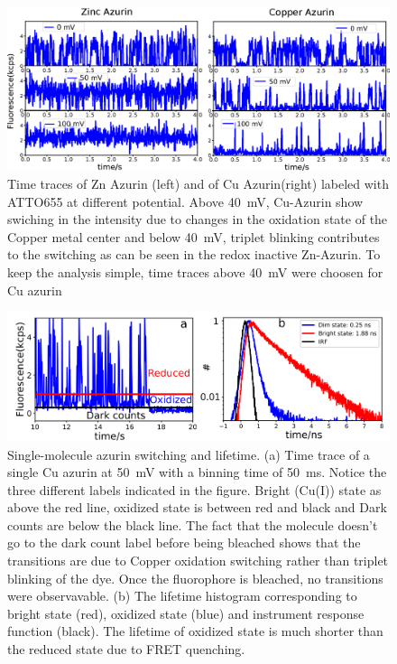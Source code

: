 \documentclass[11pt,a4paper,onecolumn]{article}
\begin{document}
\begin{figure}
  \centering
  \includegraphics[width=\textwidth,keepaspectratio]{SI_timetrace_Zn_Cu}
  \makeatletter
  \renewcommand{\fnum@figure}{\figurename~S\thefigure}
  \makeatother
  \caption{Time traces of Zn Azurin (left) and of Cu Azurin(right) labeled with ATTO655 at different potential. 
  Above \SI{40}{\mV}, Cu-Azurin show swiching in the intensity due to changes in the oxidation state of the Copper metal center and below \SI{40}{\mV}, triplet blinking contributes to the switching as can be seen in the redox inactive Zn-Azurin.
  To keep the analysis simple, time traces above \SI{40}{\mV} were choosen for Cu azurin}
  \label{SIfig:tracecomparision}
\end{figure}
\begin{figure}
  \centering
  \includegraphics{lifetime}
  \makeatletter
  \renewcommand{\fnum@figure}{\figurename~S\thefigure
}  \makeatother
  \caption{Single-molecule azurin switching and lifetime. (a) Time trace of a single Cu azurin at \SI{50}{\mV} with a binning time of \SI{50}{\ms}.
  Notice the three different labels indicated in the figure. Bright (Cu(I)) state as above the red line, oxidized state is between red and black and Dark counts are below the black line. The fact that the molecule doesn't go to the dark count label before being bleached shows that the transitions are due to Copper oxidation switching rather than triplet blinking of the dye.
  Once the fluorophore is bleached, no transitions were observavable.
  (b) The lifetime histogram corresponding to bright state (red), oxidized state (blue) and instrument response function (black).
  The lifetime of oxidized state is much shorter than the reduced state due to FRET quenching.}
  \label{SIfig: lifetime}
\end{figure}
\end{document}
